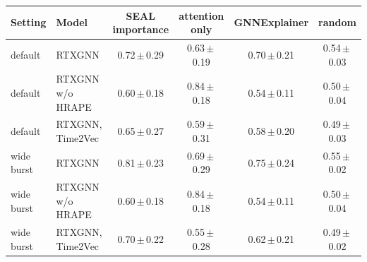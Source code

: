 \begin{tabular}{llcccc}
\toprule
Setting & Model & SEAL importance & attention only & GNNExplainer & random\\
\midrule
default & RTXGNN & 0.72\,$\pm$\,0.29 & 0.63\,$\pm$\,0.19 & 0.70\,$\pm$\,0.21 & 0.54\,$\pm$\,0.03\\
default & RTXGNN w/o HRAPE & 0.60\,$\pm$\,0.18 & 0.84\,$\pm$\,0.18 & 0.54\,$\pm$\,0.11 & 0.50\,$\pm$\,0.04\\
default & RTXGNN, Time2Vec & 0.65\,$\pm$\,0.27 & 0.59\,$\pm$\,0.31 & 0.58\,$\pm$\,0.20 & 0.49\,$\pm$\,0.03\\
wide burst & RTXGNN & 0.81\,$\pm$\,0.23 & 0.69\,$\pm$\,0.29 & 0.75\,$\pm$\,0.24 & 0.55\,$\pm$\,0.02\\
wide burst & RTXGNN w/o HRAPE & 0.60\,$\pm$\,0.18 & 0.84\,$\pm$\,0.18 & 0.54\,$\pm$\,0.11 & 0.50\,$\pm$\,0.04\\
wide burst & RTXGNN, Time2Vec & 0.70\,$\pm$\,0.22 & 0.55\,$\pm$\,0.28 & 0.62\,$\pm$\,0.21 & 0.49\,$\pm$\,0.02\\
\bottomrule
\end{tabular}

